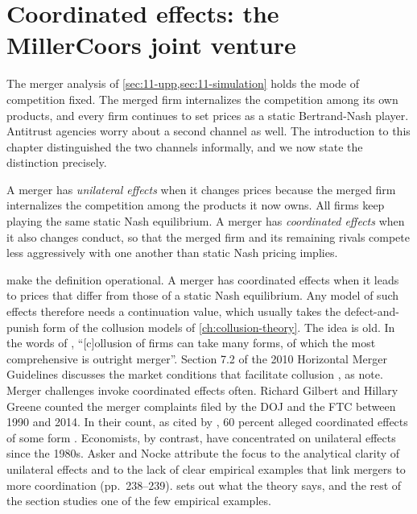 \section{Coordinated effects: the MillerCoors joint venture}\label{sec:11-millercoors}

The merger analysis of \cref{sec:11-upp,sec:11-simulation} holds the mode of competition fixed. The merged firm
internalizes the competition among its own products, and every firm continues to set prices as a static
Bertrand-Nash player. Antitrust agencies worry about a second channel as well. The introduction to this chapter
distinguished the two channels informally, and we now state the distinction precisely.

\begin{definition}\label{def:11-coordinated}
A merger has \emph{unilateral effects} when it changes prices because the merged firm internalizes the competition
among the products it now owns. All firms keep playing the same static Nash equilibrium. A merger has
\emph{coordinated effects} when it also changes conduct, so that the merged firm and its remaining rivals compete
less aggressively with one another than static Nash pricing implies.
\end{definition}

\citet[p.~238]{AskerNocke2021} make the definition operational. A merger has coordinated effects when it leads to
prices that differ from those of a static Nash equilibrium. Any model of such effects therefore needs a continuation
value, which usually takes the defect-and-punish form of the collusion models of \cref{ch:collusion-theory}. The
idea is old. In the words of \citet{Stigler1964}, ``[c]ollusion of firms can take many forms, of which the most
comprehensive is outright merger''.
Section 7.2 of the 2010 Horizontal Merger
Guidelines discusses the market conditions that facilitate collusion \citep{USDOJFTC2010}, as \citet[p.~203,
n.~67]{AskerNocke2021} note. Merger challenges invoke coordinated effects often. Richard Gilbert and Hillary Greene
counted the merger complaints filed by the DOJ and the FTC between 1990 and 2014. In their count, as cited by
\citet{MillerWeinberg2017}, 60 percent alleged coordinated effects of some form \citep[p.~238,
n.~154]{AskerNocke2021}. Economists, by contrast, have concentrated on unilateral effects since the
1980s. Asker and Nocke attribute the focus to the analytical clarity of unilateral effects and to the lack of clear
empirical examples that link mergers to more coordination (pp.~238--239).  sets out what the
theory says, and the rest of the section studies one of the few empirical examples.

